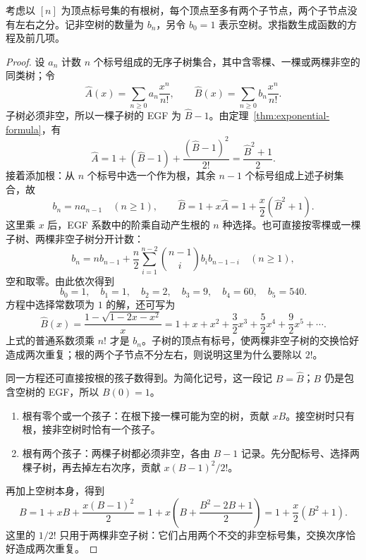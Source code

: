 \documentclass[lang=cn,a4paper,fontset=none,zihao=false,10pt,openany,twoside]{beautybook}
\numberwithin{algorithm}{chapter}
\begin{document}
\begin{example}[标号的无序二叉树]\label{ex:labelled-binary-trees}
考虑以 $[n]$ 为顶点标号集的有根树，每个顶点至多有两个子节点，两个子节点没有左右之分。记非空树的数量为 $b_n$，另令 $b_0=1$ 表示空树。求指数生成函数的方程及前几项。
\end{example}
\begin{proof}
设 $a_n$ 计数 $n$ 个标号组成的无序子树集合，其中含零棵、一棵或两棵非空的同类树；令
\[
 \widehat A(x)=\sum_{n\ge0}a_n\frac{x^n}{n!},\qquad
 \widehat B(x)=\sum_{n\ge0}b_n\frac{x^n}{n!}.
\]
子树必须非空，所以一棵子树的 EGF 为 $\widehat B-1$。由定理~\ref{thm:exponential-formula}，有
\[
 \widehat A=1+(\widehat B-1)+\frac{(\widehat B-1)^2}{2!}
 =\frac{\widehat B^2+1}{2}.
\]
接着添加根：从 $n$ 个标号中选一个作为根，其余 $n-1$ 个标号组成上述子树集合，故
\[
 b_n=na_{n-1}\quad(n\ge1),\qquad
 \widehat B=1+x\widehat A
 =1+\frac{x}{2}(\widehat B^2+1).
\]
这里乘 $x$ 后，EGF 系数中的阶乘自动产生根的 $n$ 种选择。也可直接按零棵或一棵子树、两棵非空子树分开计数：
\[
 b_n=nb_{n-1}+\frac n2\sum_{i=1}^{n-2}
       \binom{n-1}i b_i b_{n-1-i}\quad(n\ge1),
\]
空和取零。由此依次得到
\[
 b_0=1,\quad b_1=1,\quad b_2=2,\quad b_3=9,\quad
 b_4=60,\quad b_5=540.
\]
方程中选择常数项为 $1$ 的解，还可写为
\[
 \widehat B(x)=\frac{1-\sqrt{1-2x-x^2}}x
 =1+x+x^2+\frac32x^3+\frac52x^4+\frac92x^5+\cdots.
\]
上式的普通系数须乘 $n!$ 才是 $b_n$。子树的顶点有标号，使两棵非空子树的交换恰好造成两次重复；根的两个子节点不分左右，则说明这里为什么要除以 $2!$。

同一方程还可直接按根的孩子数得到。为简化记号，这一段记 $B=\widehat B$；$B$ 仍是包含空树的 EGF，所以 $B(0)=1$。
\begin{enumerate}[(1)]
\item 根有零个或一个孩子：在根下接一棵可能为空的树，贡献 $xB$。接空树时只有根，接非空树时恰有一个孩子。
\item 根有两个孩子：两棵子树都必须非空，各由 $B-1$ 记录。先分配标号、选择两棵子树，再去掉左右次序，贡献 $x(B-1)^2/2!$。
\end{enumerate}
再加上空树本身，得到
\[
 B=1+xB+\frac{x(B-1)^2}{2}
  =1+x\left(B+\frac{B^2-2B+1}{2}\right)
  =1+\frac x2(B^2+1).
\]
这里的 $1/2!$ 只用于两棵非空子树：它们占用两个不交的非空标号集，交换次序恰好造成两次重复。
\end{proof}
\end{document}
